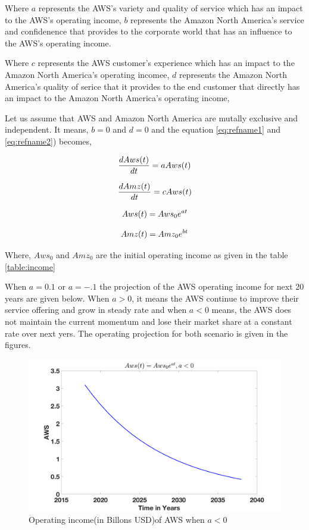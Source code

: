\documentclass[fleqn,10pt]{SelfArx} %
\begin{document}
Where $a$ represents the AWS's variety and quality of service which has an impact to the AWS's operating income, $b$ represents the Amazon North America's service and confidenence that provides to the corporate world that has an influence to the AWS's operating income. 

Where $c$ represents the AWS customer's experience which has an impact to the Amazon North America's operating incomee, $d$ represents the Amazon North America's quality of serice that it provides to the end customer that directly has an impact to the Amazon North America's operating income, 

Let us assume that AWS and Amazon North America are mutally exclusive and independent. It means, $b=0$ and $d=0$ and the equation \ref{eq:refname1} and \ref{eq:refname2}) becomes,

\begin{equation} \centering
\frac{dAws(t)}{dt} = aAws(t) 
\label{eq:refname3}
\end{equation}

\begin{equation} \centering
\frac{dAmz(t)}{dt} = cAws(t) 
\label{eq:refname4}
\end{equation}

\begin{equation} \centering
Aws(t) = Aws_0 e^{at}
\label{eq:refname3}
\end{equation}

\begin{equation} \centering
Amz(t) = Amz_0e^{bt}
\label{eq:refname4}
\end{equation}

Where, $Aws_0$ and $Amz_0$ are the initial operating income as given in the table \ref{table:income}

When $a=0.1$ or $a=-.1$ the projection of the AWS operating income for next 20 years are given below. When $a>0$, it means the AWS continue to improve their service offering and grow in steady rate and when $a<0$ means, the AWS does not maintain the current momentum and lose their market share at a constant rate over next yers. The operating projection for both scenario is given in the figures. 


\begin{figure}[ht]\centering
\includegraphics[width=\linewidth]{awsincome1}
\caption{Operating income(in Billons USD)of AWS when $a < 0$}
\label{fig:awsincome1}
\end{figure}
\end{document}
